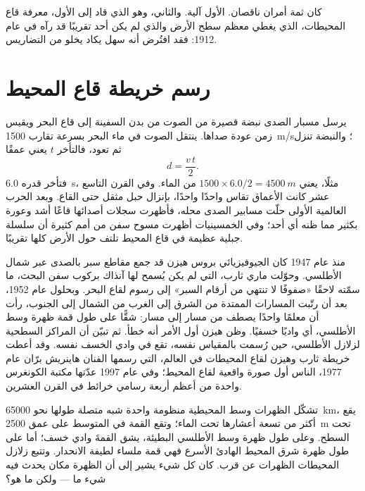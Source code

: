 كان ثمة أمران ناقصان. الأول آلية. والثاني، وهو الذي قاد إلى
الأول، معرفة قاع المحيطات، الذي يغطي معظم سطح
الأرض والذي لم يكن أحد تقريبًا قد رآه في عام 1912: فقد افتُرض أنه
سهل يكاد يخلو من التضاريس.

\section{رسم خريطة قاع المحيط}

يرسل مسبار الصدى نبضة قصيرة من الصوت من بدن السفينة إلى
قاع البحر ويقيس زمن عودة صداها. ينتقل الصوت في ماء البحر بسرعة تقارب
\qty{1500}{m/s}؛ والنبضة تنزل ثم تعود، فالتأخر $t$ يعني
عمقًا
\[
  d = \frac{v\,t}{2}.
\]
فتأخر قدره \qty{6.0}{s}، مثلًا، يعني $1500 \times 6.0/2 =
\qty{4500}{m}$ من الماء. وفي القرن التاسع عشر كانت الأعماق تقاس واحدًا
واحدًا، بإنزال حبل مثقل حتى القاع. وبعد الحرب العالمية
الأولى حلّت مسابير الصدى محله، فأظهرت سجلات أصدائها قاعًا
أشد وعورة بكثير مما ظنه أي أحد؛ وفي الخمسينيات أظهرت مسوح سفن من أمم كثيرة أن
سلسلة جبلية عظيمة في قاع المحيط تلتف حول الأرض كلها
تقريبًا.

\begin{history}
منذ عام 1947 كان الجيوفيزيائي بروس هيزن قد جمع مقاطع سبر بالصدى
عبر شمال الأطلسي. وحوّلت ماري ثارب، التي لم يكن يُسمح لها آنذاك بركوب سفن
البحث، ما سمّته لاحقًا «صفوفًا لا تنتهي من أرقام
السبر» إلى رسوم لقاع البحر. وبحلول عام 1952، بعد أن رتّبت المسارات الممتدة من الشرق
إلى الغرب من الشمال إلى الجنوب، رأت أن معلمًا واحدًا يصطف
من مسار إلى مسار: شقًّا على طول قمة ظهرة وسط الأطلسي، أي واديًا
خسفيًا. وظن هيزن أول الأمر أنه خطأ. ثم تبيّن أن المراكز السطحية
لزلازل الأطلسي، حين رُسمت بالمقياس نفسه، تقع في وادي
الخسف نفسه. وقد أعطت خريطة ثارب وهيزن لقاع المحيطات في العالم،
التي رسمها الفنان هاينريش برّان عام 1977، الناس أول صورة واقعية لقاع المحيط؛ وفي عام 1997
عدّتها مكتبة الكونغرس واحدة من أعظم أربعة رسامي خرائط في
القرن العشرين.
\end{history}

تشكّل الظهرات وسط المحيطية منظومة واحدة شبه متصلة طولها نحو
\qty{65000}{km}، يقع أكثر من تسعة أعشارها تحت الماء؛ وتقع القمة
في المتوسط على عمق \qty{2500}{m} تحت السطح. وعلى طول ظهرة وسط الأطلسي البطيئة،
يشق القمةَ وادي خسف؛ أما على طول ظهرة شرق المحيط الهادئ الأسرع فهي
قمة ملساء لطيفة الانحدار. وتتبع زلازل المحيطات الظهرات
عن قرب. كان كل شيء يشير إلى أن الظهرة مكان
يحدث فيه شيء ما --- ولكن ما هو؟

